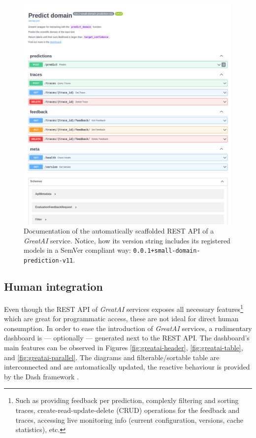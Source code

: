 \begin{figure}
    \centering
    \includegraphics[width=0.85\linewidth]{figures/greatai-api.png}
    \captionsetup{width=.9\linewidth}
    \caption{Documentation of the automatically scaffolded REST API of a \textit{GreatAI} service. Notice, how its version string includes its registered models in a SemVer compliant way: \texttt{0.0.1+small-domain-prediction-v11}.}
    \label{fig:greatai-api}
\end{figure}

\subsection{Human integration}

Even though the REST API of \textit{GreatAI} services exposes all necessary features\footnote{Such as providing feedback per prediction, complexly filtering and sorting traces, create-read-update-delete (CRUD) operations for the feedback and traces, accessing live monitoring info (current configuration, versions, cache statistics), etc.} which are great for programmatic access, these are not ideal for direct human consumption. In order to ease the introduction of \textit{GreatAI} services, a rudimentary dashboard is --- optionally --- generated next to the REST API. The dashboard's main features can be observed in Figures \ref{fig:greatai-header}, \ref{fig:greatai-table}, and \ref{fig:greatai-parallel}. The diagrams and filterable/sortable table are interconnected and are automatically updated, the reactive behaviour is provided by the Dash framework \cite{shammamah_hossain-proc-scipy-2019}.

